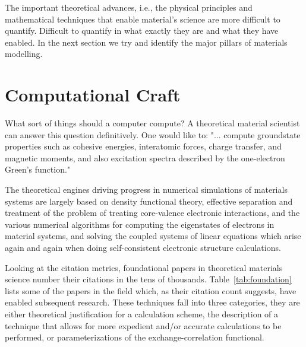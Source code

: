 The important theoretical advances, i.e., the physical principles and
mathematical techniques that enable material's science are more difficult to quantify. 
Difficult to quantify in what exactly they are and what they have enabled. In the
next section we try and identify the major pillars of materials modelling.

\section{Computational Craft}

What sort of things should a computer compute? A theoretical material scientist
can answer this question definitively. One would like to:
"... compute groundstate properties such as cohesive energies, interatomic forces, 
charge transfer, and magnetic moments, and also excitation spectra described 
by the one-electron Green's function."\cite{anderson75} 

The theoretical engines driving progress in numerical simulations of materials systems are
largely based on density functional theory, effective separation and treatment of the problem
of treating core-valence electronic interactions, and the various numerical algorithms for 
computing the eigenstates of electrons in material systems, and solving the coupled systems of linear equations which arise 
again and again when doing self-consistent electronic structure calculations.

Looking at the citation metrics, foundational papers in theoretical materials science
number their citations in the tens of thousands. Table~\ref{tab:foundation} lists some of the papers in the field which, as
their citation count suggests, have enabled subsequent research. These techniques fall into
three categories, they are either theoretical justification for a calculation scheme, the description of
a technique that allows for more expedient and/or accurate calculations to be performed, 
or parameterizations of the exchange-correlation functional.

